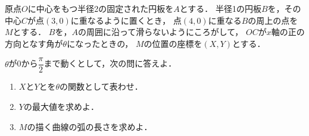 \documentclass[../../main.tex]{subfiles}
\begin{document}
原点$O$に中心をもつ半径2の固定された円板を$A$とする．
半径1の円板$B$を，その中心$C$が点$(3,0)$に重なるように置くとき，
点$(4,0)$に重なる$B$の周上の点を$M$とする．
$B$を，$A$の周囲に沿って滑らないようにころがして，
$OC$が$x$軸の正の方向となす角が$\theta$になったときの，
$M$の位置の座標を$(X,Y)$とする．

$\theta$が0から$\displaystyle\dfrac{\pi}{2}$まで動くとして，次の問に答えよ．
\begin{enumerate}
  \item $X$と$Y$とを$\theta$の関数として表わせ．
  \item $Y$の最大値を求めよ．
  \item $M$の描く曲線の弧の長さを求めよ．
\end{enumerate}
\end{document}
